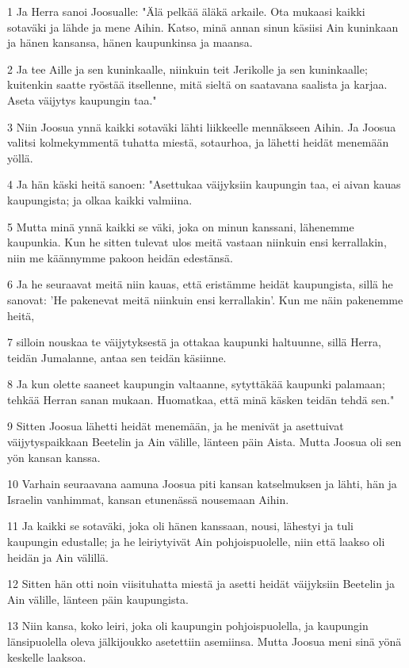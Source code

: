 \par 1 Ja Herra sanoi Joosualle: "Älä pelkää äläkä arkaile. Ota mukaasi kaikki sotaväki ja lähde ja mene Aihin. Katso, minä annan sinun käsiisi Ain kuninkaan ja hänen kansansa, hänen kaupunkinsa ja maansa.
\par 2 Ja tee Aille ja sen kuninkaalle, niinkuin teit Jerikolle ja sen kuninkaalle; kuitenkin saatte ryöstää itsellenne, mitä sieltä on saatavana saalista ja karjaa. Aseta väijytys kaupungin taa."
\par 3 Niin Joosua ynnä kaikki sotaväki lähti liikkeelle mennäkseen Aihin. Ja Joosua valitsi kolmekymmentä tuhatta miestä, sotaurhoa, ja lähetti heidät menemään yöllä.
\par 4 Ja hän käski heitä sanoen: "Asettukaa väijyksiin kaupungin taa, ei aivan kauas kaupungista; ja olkaa kaikki valmiina.
\par 5 Mutta minä ynnä kaikki se väki, joka on minun kanssani, lähenemme kaupunkia. Kun he sitten tulevat ulos meitä vastaan niinkuin ensi kerrallakin, niin me käännymme pakoon heidän edestänsä.
\par 6 Ja he seuraavat meitä niin kauas, että eristämme heidät kaupungista, sillä he sanovat: 'He pakenevat meitä niinkuin ensi kerrallakin'. Kun me näin pakenemme heitä,
\par 7 silloin nouskaa te väijytyksestä ja ottakaa kaupunki haltuunne, sillä Herra, teidän Jumalanne, antaa sen teidän käsiinne.
\par 8 Ja kun olette saaneet kaupungin valtaanne, sytyttäkää kaupunki palamaan; tehkää Herran sanan mukaan. Huomatkaa, että minä käsken teidän tehdä sen."
\par 9 Sitten Joosua lähetti heidät menemään, ja he menivät ja asettuivat väijytyspaikkaan Beetelin ja Ain välille, länteen päin Aista. Mutta Joosua oli sen yön kansan kanssa.
\par 10 Varhain seuraavana aamuna Joosua piti kansan katselmuksen ja lähti, hän ja Israelin vanhimmat, kansan etunenässä nousemaan Aihin.
\par 11 Ja kaikki se sotaväki, joka oli hänen kanssaan, nousi, lähestyi ja tuli kaupungin edustalle; ja he leiriytyivät Ain pohjoispuolelle, niin että laakso oli heidän ja Ain välillä.
\par 12 Sitten hän otti noin viisituhatta miestä ja asetti heidät väijyksiin Beetelin ja Ain välille, länteen päin kaupungista.
\par 13 Niin kansa, koko leiri, joka oli kaupungin pohjoispuolella, ja kaupungin länsipuolella oleva jälkijoukko asetettiin asemiinsa. Mutta Joosua meni sinä yönä keskelle laaksoa.
